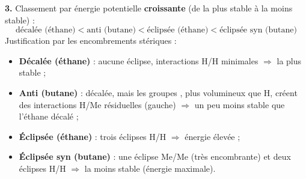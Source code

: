 \documentclass[11pt]{article}
\begin{document}
\begin{corrige}
\textbf{3.} Classement par énergie potentielle \textbf{croissante} (de la plus stable à la moins stable) :
\[
\text{décalée (éthane)} < \text{anti (butane)} < \text{éclipsée (éthane)} < \text{éclipsée syn (butane)}
\]
Justification par les encombrements stériques :
\begin{itemize}
\item \textbf{Décalée (éthane)} : aucune éclipse, interactions H/H minimales $\Rightarrow$ la plus stable ;
\item \textbf{Anti (butane)} : décalée, mais les groupes , plus volumineux que H, créent des interactions H/Me résiduelles (gauche) $\Rightarrow$ un peu moins stable que l'éthane décalé ;
\item \textbf{Éclipsée (éthane)} : trois éclipses H/H $\Rightarrow$ énergie élevée ;
\item \textbf{Éclipsée syn (butane)} : une éclipse Me/Me (très encombrante) et deux éclipses H/H $\Rightarrow$ la moins stable (énergie maximale).
\end{itemize}
\end{corrige}
\end{document}
